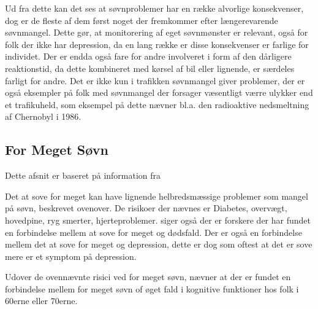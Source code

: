Ud fra dette kan det ses at søvnproblemer har en række alvorlige konsekvenser, dog er de fleste af dem først noget der fremkommer efter længerevarende søvnmangel.
Dette gør, at monitorering af eget søvnmønster er relevant, også for folk der ikke har depression, da en lang række er disse konsekvenser er farlige for individet.
Der er endda også fare for andre involveret i form af den dårligere reaktionstid, da dette kombineret med kørsel af bil eller lignende, er særdeles farligt for andre.
Det er ikke kun i trafikken søvnmangel giver problemer, der er også eksempler på folk med søvnmangel der forsager væsentligt værre ulykker end et trafikuheld, som eksempel på dette nævner \citet{misc:tenThings} bl.a. den radioaktive nedsmeltning af Chernobyl i 1986.

\subsection{For Meget Søvn}
Dette afsnit er baseret på information fra \citep{misc:oversleep} \citep{misc:longsleepsurvey}

Det at sove for meget kan have lignende helbredsmæssige problemer som mangel på søvn, beskrevet ovenover.
De risikoer der nævnes er Diabetes, overvægt, hovedpine, ryg smerter, hjerteproblemer.
\citet{misc:oversleep} siger også der er forskere der har fundet en forbindelse mellem at sove for meget og dødsfald.
Der er også en forbindelse mellem det at sove for meget og depression, dette er dog som oftest at det er sove mere er et symptom på depression.

Udover de ovennævnte risici ved for meget søvn, nævner \citet{misc:brainsleep} at der er fundet en forbindelse mellem for meget søvn of øget fald i kognitive funktioner hos folk i 60erne eller 70erne.

